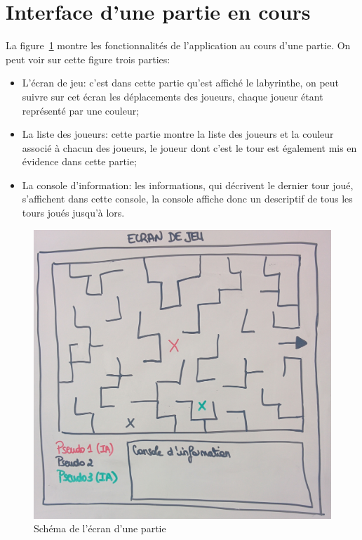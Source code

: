 \section{Interface d'une partie en cours}
	La figure~\ref{fig:ecran_partie} montre les fonctionnalités de l'application au cours d'une partie. On peut voir sur cette figure trois parties:
	\begin{itemize}
		\item L'écran de jeu: c'est dans cette partie qu'est affiché le labyrinthe, on peut suivre sur cet écran les déplacements des joueurs, chaque joueur étant représenté par une couleur;
		\item La liste des joueurs: cette partie montre la liste des joueurs et la couleur associé à chacun des joueurs, le joueur dont c'est le tour est également mis en évidence dans cette partie;
		\item La console d'information: les informations, qui décrivent le dernier tour joué, s'affichent dans cette console, la console affiche donc un descriptif de tous les tours joués jusqu'à lors.
	\end{itemize}
	\begin{figure}[h]
		\centering
		\includegraphics[width=15cm]{images/schema_ecran_partie.jpg}
		\caption{Schéma de l'écran d'une partie}
		\label{fig:ecran_partie}
	\end{figure}


